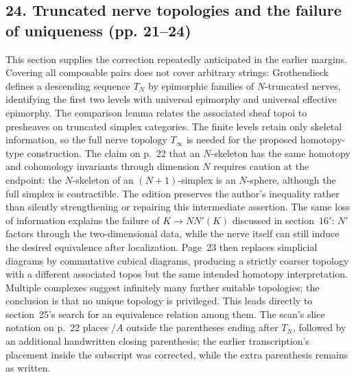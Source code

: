 \subsection*{24. Truncated nerve topologies and the failure of uniqueness (pp. 21--24)}
This section supplies the correction repeatedly anticipated in the earlier margins. Covering all composable pairs does not cover arbitrary strings: Grothendieck defines a descending sequence $T_N$ by epimorphic families of $N$-truncated nerves, identifying the first two levels with universal epimorphy and universal effective epimorphy. The comparison lemma relates the associated sheaf topoi to presheaves on truncated simplex categories. The finite levels retain only skeletal information, so the full nerve topology $T_\infty$ is needed for the proposed homotopy-type construction. The claim on p.~22 that an $N$-skeleton has the same homotopy and cohomology invariants through dimension $N$ requires caution at the endpoint: the $N$-skeleton of an $(N+1)$-simplex is an $N$-sphere, although the full simplex is contractible. The edition preserves the author's inequality rather than silently strengthening or repairing this intermediate assertion. The same loss of information explains the failure of $K\to NN'(K)$ discussed in section~16$'$: $N'$ factors through the two-dimensional data, while the nerve itself can still induce the desired equivalence after localization. Page~23 then replaces simplicial diagrams by commutative cubical diagrams, producing a strictly coarser topology with a different associated topos but the same intended homotopy interpretation. Multiple complexes suggest infinitely many further suitable topologies; the conclusion is that no unique topology is privileged. This leads directly to section~25's search for an equivalence relation among them. The scan's slice notation on p.~22 places $/A$ outside the parentheses ending after $T_N$, followed by an additional handwritten closing parenthesis; the earlier transcription's placement inside the subscript was corrected, while the extra parenthesis remains as written.

